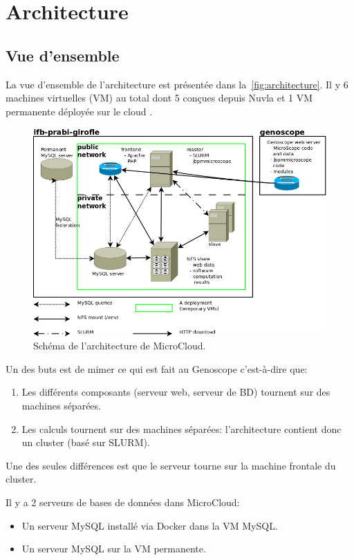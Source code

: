 \chapter{Architecture}

\section{Vue d'ensemble}

La vue d'ensemble de l'architecture est présentée dans la~\autoref{fig:architecture}.
Il y 6 machines virtuelles (VM) au total dont 5 conçues depuis Nuvla et
1 VM permanente déployée sur le cloud .

\begin{figure}[htp]
    \centering
    \includegraphics[width=\linewidth]{../Logical_Architecture}
    \caption{Schéma de l'architecture de MicroCloud.}
    \label{fig:architecture}
\end{figure}

Un des buts est de mimer ce qui est fait au Genoscope
c'est-à-dire que:
\begin{enumerate}
    \item Les différents composants (serveur web, serveur de BD) tournent sur des machines séparées.
    \item Les calculs tournent sur des machines séparées: l'architecture contient donc un cluster (basé sur SLURM).
\end{enumerate}
Une des seules différences est que le serveur  tourne
sur la machine frontale du cluster.

Il y a 2 serveurs de bases de données dans MicroCloud:
\begin{itemize}
    \item Un serveur MySQL installé via Docker dans la VM MySQL.
    \item Un serveur MySQL sur la VM permanente.
\end{itemize}

